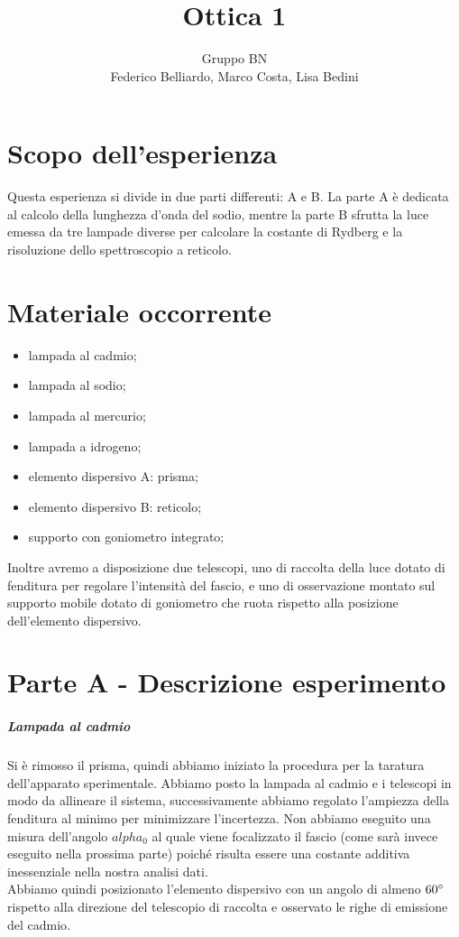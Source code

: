 \documentclass[10pt,a4paper]{article}
\author{Gruppo BN \\ Federico Belliardo, Marco Costa, Lisa Bedini}
\title{Ottica 1}
\begin{document}
\maketitle
\section{Scopo dell'esperienza}
Questa esperienza si divide in due parti differenti: A e B.
La parte A è dedicata al calcolo della lunghezza d'onda del sodio, mentre la parte B sfrutta la luce emessa da tre lampade diverse per calcolare la costante di Rydberg e la risoluzione dello spettroscopio a reticolo.\\

\section{Materiale occorrente}
\begin{itemize}
\item lampada al cadmio;
\item lampada al sodio;
\item lampada al mercurio;
\item lampada a idrogeno;
\item elemento dispersivo A: prisma;
\item elemento dispersivo B: reticolo;
\item supporto con goniometro integrato;
\end{itemize}
Inoltre avremo a disposizione due telescopi, uno di raccolta della luce dotato di fenditura per regolare l'intensità del fascio, e uno di osservazione montato sul supporto mobile dotato di goniometro che ruota rispetto alla posizione dell'elemento dispersivo.\\
\section{Parte A - Descrizione esperimento}
\subparagraph{Lampada al cadmio}

Si è rimosso il prisma, quindi abbiamo iniziato la procedura per la taratura dell'apparato sperimentale. Abbiamo posto la lampada al cadmio e i telescopi in modo da allineare il sistema, successivamente abbiamo regolato l'ampiezza della fenditura al minimo per minimizzare l'incertezza. Non abbiamo eseguito una misura dell'angolo $alpha_0$ al quale viene focalizzato il fascio (come sarà invece eseguito nella prossima parte) poiché risulta essere una costante additiva inessenziale nella nostra analisi dati.\\ 
Abbiamo quindi posizionato l'elemento dispersivo con un angolo di almeno $60 \degree$ rispetto alla direzione del telescopio di raccolta e osservato le righe di emissione del cadmio.\\
\end{document}
